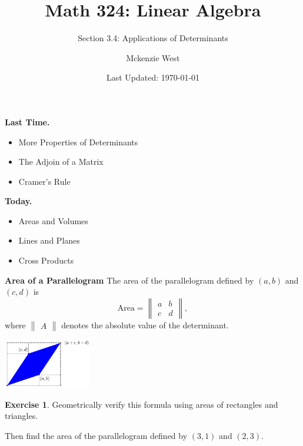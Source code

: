 \documentclass{beamer}
\newcommand{\fn}{\insertframenumber}
\theoremstyle{definition}
\newtheorem{exercise}{Exercise}
\begin{document}
	\title{Math 324: Linear Algebra}
	\subtitle{Section 3.4: Applications of Determinants}
	\author{Mckenzie West}
	\date{Last Updated: \today}
\begin{frame}
\maketitle
\end{frame}

\begin{frame}{\insertframenumber}
	\begin{block}{\textbf{Last Time.}}
	\begin{itemize}[label=--]
		\item More Properties of Determinants
		\item The Adjoin of a Matrix
		\item Cramer's Rule
	\end{itemize}
	\end{block}
	\begin{block}{\textbf{Today.}}
		\begin{itemize}[label=--]
			\item Areas and Volumes
			\item Lines and Planes
			\item Cross Products
		\end{itemize}
	\end{block}
\end{frame}

\begin{frame}{\fn}
	\begin{block}{\textbf{Area of a Parallelogram}}
			The area of the parallelogram defined by $(a,b)$ and $(c,d)$ is	
			\[\text{Area}=\begin{Vmatrix}a&b\\c&d\end{Vmatrix},\]
			where $\begin{Vmatrix}A\end{Vmatrix}$ denotes the absolute value of the determinant.
			\begin{center}
			\includegraphics[width=1.5in]{../images/parallelogram}
			\end{center}
	\end{block}
	\begin{exercise}
		Geometrically verify this formula using areas of rectangles and triangles.
		
		Then find the area of the parallelogram defined by $(3,1)$ and $(2,3)$.
	\end{exercise}
\end{frame}
\end{document}
